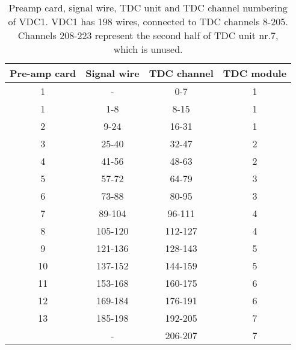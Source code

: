 \documentclass[11pt]{report}
\begin{document}
\begin{table}[!ht]
\centering
\begin{tabular}{|c|c|c|c|}
\hline
Pre-amp card & Signal wire & TDC channel & TDC module\\ 
\hline
\hline
1 & -       & 0-7     & 1 \\
1 & 1-8     & 8-15    & 1 \\
2 & 9-24    & 16-31   & 1 \\
3 & 25-40   & 32-47   & 2 \\
4 & 41-56   & 48-63   & 2 \\
5 & 57-72   & 64-79   & 3 \\
6 & 73-88   & 80-95   & 3 \\
7 & 89-104  & 96-111  & 4 \\
8 & 105-120 & 112-127 & 4 \\
9 & 121-136 & 128-143 & 5 \\
10 & 137-152 & 144-159 & 5 \\
11 & 153-168 & 160-175 & 6 \\
12 & 169-184 & 176-191 & 6 \\
13 & 185-198 & 192-205 & 7 \\
   & -       & 206-207 & 7 \\
\hline
\end{tabular}
\caption{Preamp card, signal wire, TDC unit and TDC channel numbering of VDC1.
VDC1 has 198 wires, connected to TDC channels 8-205. Channels 208-223
represent the second half of TDC unit nr.7, which is unused.}
\label{table:tdc-chan-numbering-vdc1}
\end{table}
\end{document}
